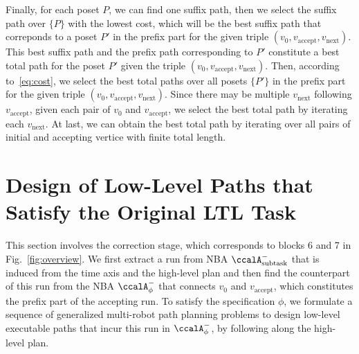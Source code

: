 \documentclass[Afour,sageh,times]{sagej}
\newcommand{\auto}[1]{\ccalA_{\text{#1}}}
\newcommand{\autop}{\ccalA_{\phi}}
\begin{document}
{ %


Finally, for each poset $P$, we can find one suffix path, then we select the suffix path over $\{P\}$ with the lowest cost, which will be the best suffix path that correponds to a poset $P'$ in the prefix part for the given triple $(v_0, v_{\text{accept}}, v_{\text{next}})$. This best suffix path and the prefix path corresponding to $P'$ constitute a best total path for the poset $P'$ given the triple $(v_0, v_{\text{accept}}, v_{\text{next}})$. Then, according to~\eqref{eq:cost}, we select the best total paths over all posets $\{P'\}$ in the prefix part for the given triple $(v_0, v_{\text{accept}}, v_{\text{next}})$.  Since there may be multiple $v_{\text{next}}$ following $v_{\text{accept}}$, given each pair of $v_0$ and $v_{\text{accept}}$, we select the best total path by iterating each $v_{\text{next}}$. At last, we can obtain the best total path by iterating over all pairs of initial and accepting vertice with finite total length.


  \section{Design of Low-Level Paths that Satisfy the Original LTL Task}\label{sec:solution2mrta}
 This section involves the correction stage, which corresponds to blocks 6 and 7 in Fig.~\ref{fig:overview}. We first extract a run from NBA $\auto{subtask}^-$ that is induced from the time axis and the high-level plan and then find the counterpart of this run from the NBA $\autop^-$ that connects $v_0$ and $v_{\text{accept}}$, which constitutes the prefix part of the accepting run. To satisfy the specification $\phi$, we formulate a sequence of generalized multi-robot path planning problems to design low-level executable paths that incur this run in $\autop^-$, by following along the high-level plan.
}
\end{document}
